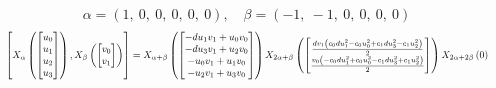 \documentclass[11pt]{article}
\theoremstyle{definition}
\begin{document}
\[
\alpha = \left( 1, \  0, \  0, \  0, \  0, \  0\right), \quad \beta = \left( -1, \  -1, \  0, \  0, \  0, \  0\right)
\]
\[
\scaletoalign{\textwidth}{\left[ X_{\alpha}\left(\left[\begin{matrix}u_{0}\\u_{1}\\u_{2}\\u_{3}\end{matrix}\right]\right), X_{\beta}\left(\left[\begin{matrix}v_{0}\\v_{1}\end{matrix}\right]\right) \right] = X_{\alpha + \beta}\left(\left[\begin{matrix}- d u_{1} v_{1} + u_{0} v_{0}\\- d u_{3} v_{1} + u_{2} v_{0}\\- u_{0} v_{1} + u_{1} v_{0}\\- u_{2} v_{1} + u_{3} v_{0}\end{matrix}\right]\right) X_{2\alpha + \beta}\left(\left[\begin{matrix}\frac{d v_{1} \left(c_{0} d u_{1}^{2} - c_{0} u_{0}^{2} + c_{1} d u_{3}^{2} - c_{1} u_{2}^{2}\right)}{2}\\\frac{v_{0} \left(- c_{0} d u_{1}^{2} + c_{0} u_{0}^{2} - c_{1} d u_{3}^{2} + c_{1} u_{2}^{2}\right)}{2}\end{matrix}\right]\right) X_{2\alpha + 2\beta}\left(0\right)}
\]
\end{document}

